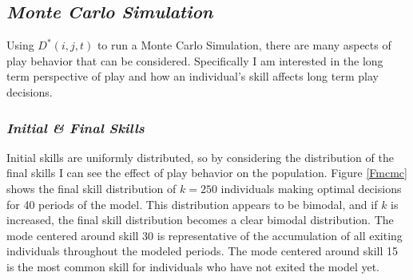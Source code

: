 \documentclass[12pt,letterpaper]{article}
\begin{document}
      
  \subsection{\it Monte Carlo Simulation}
    Using $D^*(i,j,t)$ to run a Monte Carlo Simulation, there are many aspects of play behavior that can be considered.
    Specifically I am interested in the long term perspective of play and how an individual's skill affects long term play decisions.      
    \subsubsection{\it Initial \& Final Skills}
      Initial skills are uniformly distributed, so by considering the distribution of the final skills I can see the effect of play behavior on the population.
      Figure \ref{Fmcmc} shows the final skill distribution of $k=250$ individuals making optimal decisions for 40 periods of the model.
      This distribution appears to be bimodal, and if $k$ is increased, the final skill distribution becomes a clear bimodal distribution.
      The mode centered around skill 30 is representative of the accumulation of all exiting individuals throughout the modeled periods. 
      The mode centered around skill 15 is the most common skill for individuals who have not exited the model yet.
      
\end{document}
